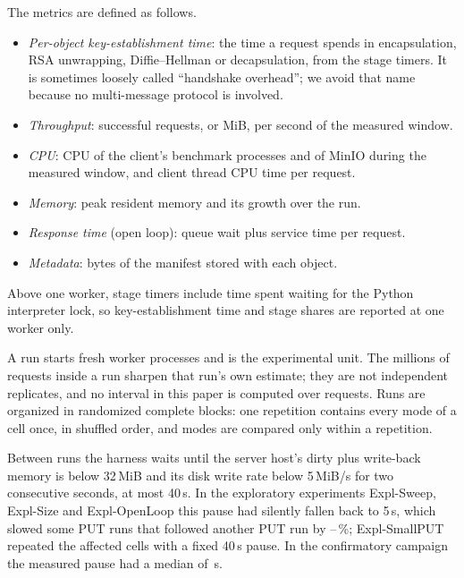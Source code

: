 \documentclass[review,12pt]{elsarticle}
\newcommand{\lab}[1]{\textsf{#1}}
\begin{document}
The metrics are defined as follows.
\begin{itemize}
\item \emph{Per-object key-establishment time}: the time a request spends in encapsulation, RSA
unwrapping, Diffie--Hellman or decapsulation, from the stage timers. It is sometimes loosely
called ``handshake overhead''; we avoid that name because no multi-message protocol is
involved.
\item \emph{Throughput}: successful requests, or MiB, per second of the measured window.
\item \emph{CPU}: CPU of the client's benchmark processes and of MinIO during the measured
window, and client thread CPU time per request.
\item \emph{Memory}: peak resident memory and its growth over the run.
\item \emph{Response time} (open loop): queue wait plus service time per request.
\item \emph{Metadata}: bytes of the manifest stored with each object.
\end{itemize}
Above one worker, stage timers include time spent waiting for the Python interpreter lock, so
key-establishment time and stage shares are reported at one worker only.

A run starts fresh worker processes and is the experimental unit. The millions of requests inside
a run sharpen that run's own estimate; they are not independent replicates, and no interval in
this paper is computed over requests. Runs are organized in randomized complete blocks: one
repetition contains every mode of a cell once, in shuffled order, and modes are compared only
within a repetition.

Between runs the harness waits until the server host's dirty plus write-back memory is below
32\,MiB and its disk write rate below 5\,MiB/s for two consecutive seconds, at most 40\,s. In the
exploratory experiments \lab{Expl-Sweep}, \lab{Expl-Size} and \lab{Expl-OpenLoop} this pause had silently fallen back to 5\,s, which slowed some PUT runs
that followed another PUT run by \StallSlowMin--\StallSlowMax\,\%; \lab{Expl-SmallPUT} repeated the affected
cells with a fixed 40\,s pause. In the confirmatory campaign the measured pause had a median of
\RevSettleMedian\,s.
\end{document}
